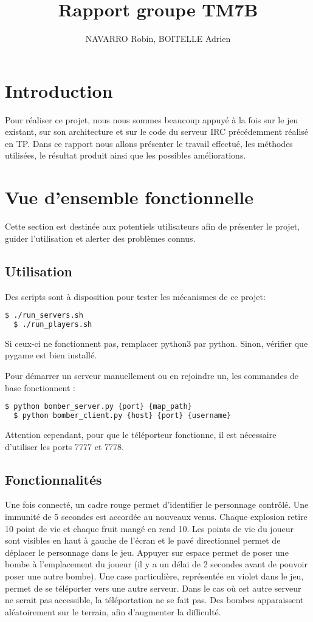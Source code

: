 \documentclass[12pt]{article}
\title{Rapport groupe TM7B}
\author{NAVARRO Robin, BOITELLE Adrien}
\begin{document}
\maketitle

\newpage
\tableofcontents
\newpage

\section{Introduction}
Pour réaliser ce projet, nous nous sommes beaucoup appuyé à la fois sur le jeu existant, sur son architecture et sur le code du serveur IRC précédemment réalisé en TP. Dans ce rapport nous allons présenter le travail effectué, les méthodes utilisées, le résultat produit ainsi que les possibles améliorations.

\section{Vue d'ensemble fonctionnelle}

Cette section est destinée aux potentiels utilisateurs afin de présenter le projet, guider l'utilisation et alerter des problèmes connus.

\subsection{Utilisation}

Des scripts sont à disposition pour tester les mécanismes de ce projet:
\begin{lstlisting}[language=bash]
  $ ./run_servers.sh
  $ ./run_players.sh
\end{lstlisting}
Si ceux-ci ne fonctionnent pas, remplacer python3 par python. Sinon, vérifier que pygame est bien installé.

Pour démarrer un serveur manuellement ou en rejoindre un, les commandes de base fonctionnent : 
\begin{lstlisting}[language=bash]
  $ python bomber_server.py {port} {map_path}
  $ python bomber_client.py {host} {port} {username}
\end{lstlisting}

Attention cependant, pour que le téléporteur fonctionne, il est nécessaire d'utiliser les ports 7777 et 7778.
\subsection{Fonctionnalités}
Une fois connecté, un cadre rouge permet d'identifier le personnage contrôlé. Une immunité de 5 secondes est accordée au nouveaux venus. Chaque explosion retire 10 point de vie et chaque fruit mangé en rend 10. Les points de vie du joueur sont visibles en haut à gauche de l'écran et le pavé directionnel permet de déplacer le personnage dans le jeu. Appuyer sur espace permet de poser une bombe à l'emplacement du joueur (il y a un délai de 2 secondes avant de pouvoir poser une autre bombe).
\newpage
Une case particulière, représentée en violet dans le jeu, permet de se téléporter vers une autre serveur.
Dans le cas où cet autre serveur ne serait pas accessible, la téléportation ne se fait pas.
Des bombes apparaissent aléatoirement sur le terrain, afin d'augmenter la difficulté.
\end{document}
